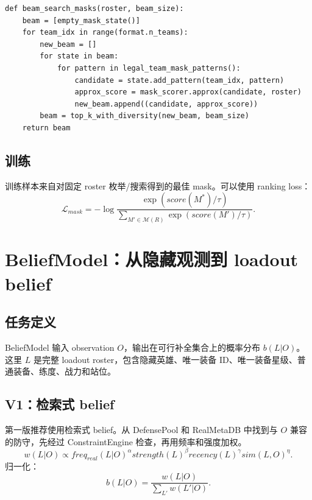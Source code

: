 \documentclass[UTF8,12pt,openany]{ctexbook}
\begin{document}
\begin{lstlisting}[caption={BO5 mask beam search}]
def beam_search_masks(roster, beam_size):
    beam = [empty_mask_state()]
    for team_idx in range(format.n_teams):
        new_beam = []
        for state in beam:
            for pattern in legal_team_mask_patterns():
                candidate = state.add_pattern(team_idx, pattern)
                approx_score = mask_scorer.approx(candidate, roster)
                new_beam.append((candidate, approx_score))
        beam = top_k_with_diversity(new_beam, beam_size)
    return beam
\end{lstlisting}

\section{训练}
训练样本来自对固定 roster 枚举/搜索得到的最佳 mask。可以使用 ranking loss：
\begin{equation}
\mathcal{L}_{mask}=-\log\frac{\exp(score(M^*)/\tau)}{\sum_{M'\in\mathcal{M}(R)}\exp(score(M')/\tau)}.
\end{equation}


\chapter{BeliefModel：从隐藏观测到 loadout belief}

\section{任务定义}
BeliefModel 输入 observation $O$，输出在可行补全集合上的概率分布 $b(L|O)$。这里 $L$ 是完整 loadout roster，包含隐藏英雄、唯一装备 ID、唯一装备星级、普通装备、练度、战力和站位。

\section{V1：检索式 belief}
第一版推荐使用检索式 belief。从 DefensePool 和 RealMetaDB 中找到与 $O$ 兼容的防守，先经过 ConstraintEngine 检查，再用频率和强度加权。
\begin{equation}
w(L|O)\propto freq_{real}(L|O)^\alpha strength(L)^\beta recency(L)^\gamma sim(L,O)^\eta.
\end{equation}
归一化：
\begin{equation}
b(L|O)=\frac{w(L|O)}{\sum_{L'}w(L'|O)}.
\end{equation}
\end{document}
